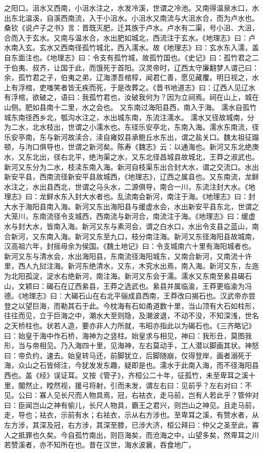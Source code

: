 \documentclass[12pt,UTF8]{ctexbook}
\begin{document}
之阳口。沮水又西南，小沮水注之，水发冷溪，世谓之冷池。又南得温泉水口，水出东北温溪，自溪西南流，入于小沮水。小沮水又南流与大沮水合，而为卢水也。桑钦《说卢子之书》言：晋既灭肥，迁其族于卢水。卢水有二渠，号小沮、大沮，合而入于玄水。又南与温水合，水出肥如城北，西流注于玄水。《地理志》曰：卢水南入玄。玄水又西南径孤竹城北，西入濡水。故《地理志》曰：玄水东入濡，盖自东面注也。《地理志》曰：令支有孤竹城，故孤竹国也。《史记》曰：孤竹君之二于伯夷、叔齐，让国于此，而饿死于首阳。汉灵帝时，辽西太守廉翻梦人谓己曰：余，孤竹君之子，伯夷之弟，辽海漂吾棺椁，闻君仁善，愿见藏覆。明日视之，水上有浮棺，吏嗤笑者皆无疾而死，于是改葬之。《晋书地道志》曰：辽西人见辽水有浮棺，欲破之，语曰：我孤竹君也，汝破我何为？因为立祠焉。祠在山上，城在山侧。肥如县南十二里，水之会也。
又东南过海阳县西，南入于海。
濡水自孤竹城东南径西乡北，瓠沟水注之，水出城东南，东流注濡水。
濡水又径故城南，分为二水，北水枝出，世谓之小濡水也。东径乐安亭北，东南入海。濡水东南流，径乐安亭南，东与新河故渎合，渎自雍奴县承鲍丘水东出，谓之盐关口。魏太祖征蹋顿，与泃口俱导也，世谓之新河矣。陈寿《魏志》云：以通海也。新河又东北绝庚水，又东北出，径右北平，绝泃渠之水，又东北径昌城县故城北，王莽之淑武也。新河又东分为二水，枝渎东南入海。新河自枝渠东出合封大水，谓之交流口。水出新安平县，西南流径新安平县故城西，《地理志》，辽西之属县也。又东南流，龙鲜水注之，水出县西北，世谓之马头水，二源俱导，南合一川，东流注封大水。《地理志》曰：龙鲜水东入封大水者也。乱流南会新河，南注于海。《地理志》曰：封大水于海阳县南入海。新河又东出海阳县与缓虚水会，水出新安平县东北，世谓之大笼川，东南流径令支城西，西南流与新河合，南流注于海。《地理志》曰：缓虚水与封大水，皆南入海。新河又东与素河会，谓之白水口，水出令支县之蓝山，南合新河，又东南入海。新河又东至九口，枝分南注海。新河又东径海阳县故城南，汉高祖六年，封摇毋余为侯国。《魏土地记》曰：令支城南六十里有海阳城者也。新河又东与清水会，水出海阳县，东南流径海阳城东，又南合新河，又南流十许里，西人九挝注海。新河东绝清水，又东，木究水出焉，南入海。新河又东，左迤为北阳孤淀，淀水右绝新河，南注海。新河又东会于濡。濡水又东南至絫县碣石山，文颖曰：碣石在辽西絫县，王莽之选武也。絫县并属临渝，王莽更临渝为冯德。《地理志》曰：大碣石山在右北平骊成县西南，王莽改曰揭石也。汉武帝亦尝登之以望巨海，而勒其石于此。今枕海有石如甬道数十里，当山顶有大石如柱形，往往而见，立于巨海之中，潮水大至则隐，及潮波退，不动不没，不知深浅，世名之天桥柱也。状若人造，要亦非人力所就，韦昭亦指此以为碣石也。《三齐略记》曰：始皇于海中作石桥，海神为之竖柱。始皇求与相见，神曰：我形丑，莫图我形，当与帝相见。乃入海四十里，见海神，左右莫动手，工人潜以脚画其状。神怒曰：帝负约，速去。始皇转马还，前脚犹立，后脚随崩，仅得登岸，画者溺死于海，众山之石皆倾注，今犹发发东趣，疑即是也。濡水于此南入海，而不径海阳县西也。盖《经》误证耳。又按《管子》，齐桓公二十年，征孤竹，未至卑耳之溪十里，闟然止，瞠然视，援弓将射，引而未发，谓左右曰：见前乎？左右对曰：不见。公曰：寡人见长尺而人物具焉，冠，右袪衣，走马前，岂有人若此乎？管仲对曰：臣闻岂山之神有偷儿，长尺人物具，霸王之君兴，则岂山之神见。且走马前，走，导也；袪衣，示前有水；右袪衣，示从右方涉也。至卑耳之溪，有赞水者，从左方涉，其深及冠，右方涉，其深至膝，已涉大济，桓公拜曰：仲父之圣至此，寡人之抵罪也久矣。今自孤竹南出，则巨海矣，而沧海之中，山望多矣，然卑耳之川若赞溪者，亦不知所在也。昔在汉世，海水波襄，吞食地广，
\end{document}
